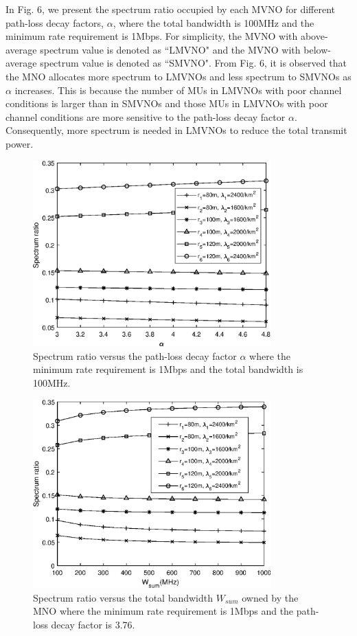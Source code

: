 \documentclass[journal]{IEEEtran}
\begin{document}
In Fig. 6, we present the spectrum ratio occupied by each MVNO for different path-loss decay factors, $\alpha$, where the total bandwidth is 100MHz and the minimum rate requirement is 1Mbps. For simplicity, the MVNO with above-average spectrum value is denoted as ``LMVNO" and the MVNO with below-average spectrum value is denoted as ``SMVNO". From Fig. 6, it is observed that the MNO allocates more spectrum to LMVNOs and less spectrum to SMVNOs as $\alpha$ increases. This is because the number of MUs in LMVNOs with poor channel conditions is larger than in SMVNOs and those MUs in LMVNOs with poor channel conditions are more sensitive to the path-loss decay factor $\alpha$. Consequently, more spectrum is needed in LMVNOs to reduce the total transmit power.
 
\begin{figure}
	\centering
	\includegraphics[width=3.6in]{SR_alpha.eps}
	\caption{Spectrum ratio versus the path-loss decay factor $\alpha$ where the minimum rate requirement is 1Mbps and the total bandwidth is 100MHz.}
\end{figure}


\begin{figure}
	\centering
	\includegraphics[width=3.6in]{SR_wsum.eps}
	\caption{Spectrum ratio versus the total bandwidth $W_{sum}$ owned by the MNO where the minimum rate requirement is 1Mbps and the path-loss decay factor is 3.76.}
\end{figure}
\end{document}
